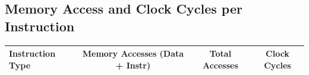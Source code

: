 \documentclass[../comorg-part1.tex]{subfiles}
\begin{document}
\begin{landscape}





\newpage

\subsection{Memory Access and Clock Cycles per Instruction}
\begin{table}[H]
\centering
\begin{tabular}{|l|c|c|c|}
\hline
\textbf{Instruction Type} & \textbf{Memory Accesses (Data + Instr)} & \textbf{Total Accesses} & \textbf{Clock Cycles} \\ \hline


\end{tabular}
\end{table}
\end{landscape}
\end{document}
